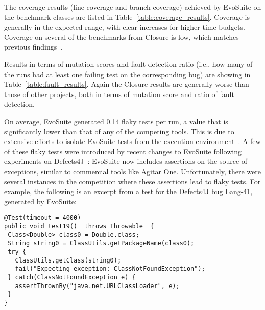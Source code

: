 \documentclass[10pt,conference]{IEEEtran}
\newcommand{\EVOSUITE}{{\sc EvoSuite}\xspace}
\begin{document}
\begin{table*}[t]
  \centering
  \caption{\label{table:coverage_results}Detailed coverage results of \EVOSUITE on the SBST benchmark classes.}
\resizebox{0.8\textwidth}{!}{  
%
}
\end{table*}

\begin{table*}[t]
  \centering
  \caption{\label{table:fault_results}Detailed fault detection results of \EVOSUITE on the SBST benchmark classes.}
\resizebox{0.8\textwidth}{!}{  
%
}	
\end{table*}



The coverage results (line coverage and branch coverage) achieved by
\EVOSUITE on the benchmark classes are listed in
Table~\ref{table:coverage_results}. Coverage is generally in the
expected range, with clear increases for higher time budgets. Coverage
on several of the benchmarks from Closure is low, which matches
previous findings~\cite{shamshiri2015automatically}. 

Results in terms of mutation scores and fault detection ratio (i.e.,
how many of the runs had at least one failing test on the
corresponding bug) are showing in
Table~\ref{table:fault_results}. Again the Closure results are
generally worse than those of other projects, both in terms of
mutation score and ratio of fault detection.

On average, \EVOSUITE generated 0.14 flaky tests per run, a value that
is significantly lower than that of any of the competing tools. This
is due to extensive efforts to isolate \EVOSUITE tests from the
execution environment~\cite{arcuri2014automated}. A few of these flaky
tests were introduced by recent changes to \EVOSUITE following
experiments on Defects4J~\cite{shamshiri2015automatically}: \EVOSUITE
now includes assertions on the source of exceptions, similar to
commercial tools like Agitar One. %
Unfortunately, there were several instances in the competition where these assertions
lead to flaky tests. For example, the following is an excerpt from a
test for the Defects4J bug Lang-41, generated by \EVOSUITE:
\vspace{1em}

\begin{lstlisting}
@Test(timeout = 4000)
public void test19()  throws Throwable  {
 Class<Double> class0 = Double.class;
 String string0 = ClassUtils.getPackageName(class0);
 try { 
   ClassUtils.getClass(string0);
   fail("Expecting exception: ClassNotFoundException"); 
 } catch(ClassNotFoundException e) {
   assertThrownBy("java.net.URLClassLoader", e);
 }
}
\end{lstlisting}
\end{document}
